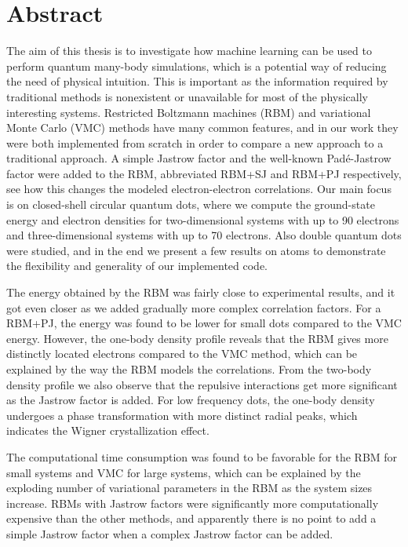 \section*{Abstract}
The aim of this thesis is to investigate how machine learning can be used to perform quantum many-body simulations, which is a potential way of reducing the need of physical intuition. This is important as the information required by traditional methods is nonexistent or unavailable for most of the physically interesting systems. Restricted Boltzmann machines (RBM) and variational Monte Carlo (VMC) methods have many common features, and in our work they were both implemented from scratch in order to compare a new approach to a traditional approach. A simple Jastrow factor and the well-known Padé-Jastrow factor were added to the RBM, abbreviated RBM+SJ and RBM+PJ respectively, see how this changes the modeled electron-electron correlations. Our main focus is on closed-shell circular quantum dots, where we compute the ground-state energy and electron densities for two-dimensional systems with up to 90 electrons and three-dimensional systems with up to 70 electrons. Also double quantum dots were studied, and in the end we present a few results on atoms to demonstrate the flexibility and generality of our implemented code.

The energy obtained by the RBM was fairly close to experimental results, and it got even closer as we added gradually more complex correlation factors. For a RBM+PJ, the energy was found to be lower for small dots compared to the VMC energy. However, the one-body density profile reveals that the RBM gives more distinctly located electrons compared to the VMC method, which can be explained by the way the RBM models the correlations. From the two-body density profile we also observe that the repulsive interactions get more significant as the Jastrow factor is added. For low frequency dots, the one-body density undergoes a phase transformation with more distinct radial peaks, which indicates the Wigner crystallization effect.

The computational time consumption was found to be favorable for the RBM for small systems and VMC for large systems, which can be explained by the exploding number of variational parameters in the RBM as the system sizes increase. RBMs with Jastrow factors were significantly more computationally expensive than the other methods, and apparently there is no point to add a simple Jastrow factor when a complex Jastrow factor can be added. 

